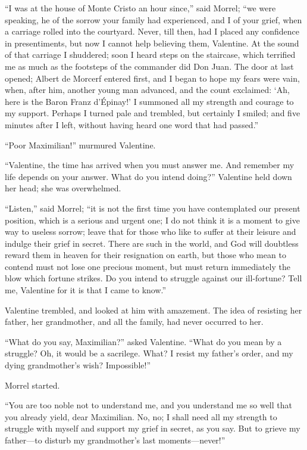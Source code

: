 “I was at the house of Monte Cristo an hour since,” said Morrel; “we
were speaking, he of the sorrow your family had experienced, and I of
your grief, when a carriage rolled into the courtyard. Never, till
then, had I placed any confidence in presentiments, but now I cannot
help believing them, Valentine. At the sound of that carriage I
shuddered; soon I heard steps on the staircase, which terrified me as
much as the footsteps of the commander did Don Juan. The door at last
opened; Albert de Morcerf entered first, and I began to hope my fears
were vain, when, after him, another young man advanced, and the count
exclaimed: ‘Ah, here is the Baron Franz d’Épinay!’ I summoned all my
strength and courage to my support. Perhaps I turned pale and trembled,
but certainly I smiled; and five minutes after I left, without having
heard one word that had passed.”

“Poor Maximilian!” murmured Valentine.

“Valentine, the time has arrived when you must answer me. And remember
my life depends on your answer. What do you intend doing?” Valentine
held down her head; she was overwhelmed.

“Listen,” said Morrel; “it is not the first time you have contemplated
our present position, which is a serious and urgent one; I do not think
it is a moment to give way to useless sorrow; leave that for those who
like to suffer at their leisure and indulge their grief in secret.
There are such in the world, and God will doubtless reward them in
heaven for their resignation on earth, but those who mean to contend
must not lose one precious moment, but must return immediately the blow
which fortune strikes. Do you intend to struggle against our
ill-fortune? Tell me, Valentine for it is that I came to know.”

Valentine trembled, and looked at him with amazement. The idea of
resisting her father, her grandmother, and all the family, had never
occurred to her.

“What do you say, Maximilian?” asked Valentine. “What do you mean by a
struggle? Oh, it would be a sacrilege. What? I resist my father’s
order, and my dying grandmother’s wish? Impossible!”

Morrel started.

“You are too noble not to understand me, and you understand me so well
that you already yield, dear Maximilian. No, no; I shall need all my
strength to struggle with myself and support my grief in secret, as you
say. But to grieve my father—to disturb my grandmother’s last
moments—never!”

